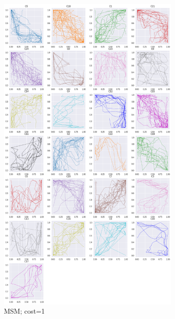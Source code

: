 \begin{figure}[h]
\begin{subfigure}[c]{0.3\linewidth}
     \includegraphics[width=\linewidth]{figs/clusters/CLU_AP_ALL[MSM;c=1].png}
    \caption{MSM; cost=1}
  \end{subfigure}
  \hspace{.5em}
    \begin{subfigure}[c]{0.3\linewidth}

\end{subfigure}
\end{figure}
